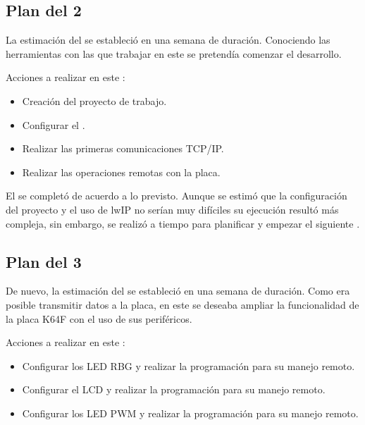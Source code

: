 \clearpage

\subsection{Plan del  2} \label{sec:plan-s2}
La estimación del  se estableció en una semana de
duración. Conociendo las herramientas con las que trabajar en este
 se pretendía comenzar el desarrollo.

Acciones a realizar en este :
\begin{itemize}
  \item Creación del proyecto de trabajo.
  \item Configurar el .
  \item Realizar las primeras comunicaciones TCP/IP.  
  \item Realizar las operaciones remotas con la placa.
\end{itemize}


El  se completó de acuerdo a lo previsto. Aunque se 
estimó que la configuración del proyecto y el uso de lwIP no serían muy
difíciles su ejecución resultó más compleja, sin embargo, se realizó a tiempo
para planificar y empezar el siguiente .

\clearpage

\subsection{Plan del  3} \label{sec:plan-s3}
De nuevo, la estimación del  se estableció en una semana
de duración. Como era posible transmitir datos a la placa, en este
 se deseaba ampliar la funcionalidad de la placa K64F
con el uso de sus periféricos.

Acciones a realizar en este :
\begin{itemize}
  \item Configurar los LED RBG y realizar la programación para su manejo remoto.
  \item Configurar el LCD y realizar la programación para su manejo remoto. 
  \item Configurar los LED PWM y realizar la programación para su manejo remoto.
\end{itemize}

